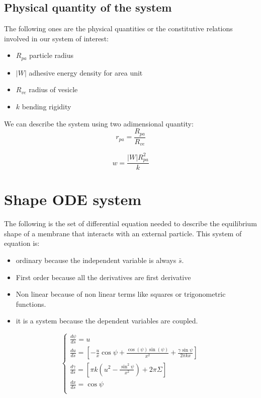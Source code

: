\documentclass[12pt]{article}
\begin{document}



\subsection{Physical quantity of the system}
The following ones are the physical quantities or the constitutive relations involved in our system of interest:

\begin{itemize}
  \item $R_{pa}$ particle radius
  \item $|W|$ adhesive energy density for area unit
  \item $R_{ve}$ radius of vesicle
  \item $k$ bending rigidity
\end{itemize}

We can describe the system using two adimensional quantity:
$$
r_{pa} = \frac{R_{pa}}{R_{ve}}
$$

$$
w = \frac{|W| R_{pa}^2}{k}
$$

\section{Shape ODE system}
The following is the set of differential equation needed to describe the equilibrium shape of a membrane that interacts with an external particle. This system of equation is:
\begin{itemize}
    \item ordinary because the independent variable is always $\bar{s}$.
    \item First order because all the derivatives are first derivative
    \item Non linear because of non linear terms like squares or trigonometric functions.
    \item it is a system because the dependent variables are coupled.
\end{itemize}


\begin{equation}
  \begin{cases} 
    \frac{d\psi}{ds} =  u \\[3mm]
    \frac{du}{ds} =  [-\frac{u}{x}\cos\psi+\frac{\cos(\psi)\sin(\psi)}{x^2}+\frac{\gamma\sin \psi}{2\pi k x}] \\[3mm]
    \frac{d\gamma}{ds} =  [\pi k (u^2-\frac{\sin^2 \psi}{x^2})+2 \pi \Sigma] \\[3mm]
    \frac{dx}{ds} =  \cos \psi \\[3mm]
  \end{cases}
\end{equation}
\end{document}
